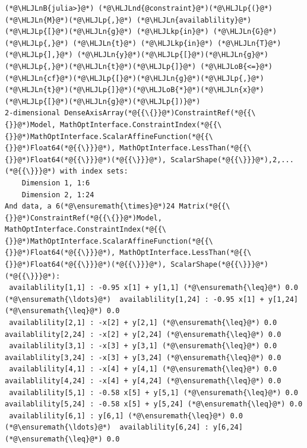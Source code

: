\documentclass[12pt,a4paper]{article}
\newcommand{\HLJLkp}[1]{\textcolor[RGB]{148,91,176}{\textbf{#1}}}
\newcommand{\HLJLn}[1]{#1}
\newcommand{\HLJLnd}[1]{\textcolor[RGB]{214,102,97}{#1}}
\newcommand{\HLJLnB}[1]{\textcolor[RGB]{59,151,46}{#1}}
\newcommand{\HLJLoB}[1]{\textcolor[RGB]{102,102,102}{\textbf{#1}}}
\newcommand{\HLJLp}[1]{#1}
\begin{document}
\begin{lstlisting}
(*@\HLJLnB{julia>}@*) (*@\HLJLnd{@constraint}@*)(*@\HLJLp{(}@*)(*@\HLJLn{M}@*)(*@\HLJLp{,}@*) (*@\HLJLn{availablility}@*)(*@\HLJLp{[}@*)(*@\HLJLn{g}@*) (*@\HLJLkp{in}@*) (*@\HLJLn{G}@*)(*@\HLJLp{,}@*) (*@\HLJLn{t}@*) (*@\HLJLkp{in}@*) (*@\HLJLn{T}@*)(*@\HLJLp{],}@*) (*@\HLJLn{y}@*)(*@\HLJLp{[}@*)(*@\HLJLn{g}@*)(*@\HLJLp{,}@*)(*@\HLJLn{t}@*)(*@\HLJLp{]}@*) (*@\HLJLoB{<=}@*) (*@\HLJLn{cf}@*)(*@\HLJLp{[}@*)(*@\HLJLn{g}@*)(*@\HLJLp{,}@*)(*@\HLJLn{t}@*)(*@\HLJLp{]}@*)(*@\HLJLoB{*}@*)(*@\HLJLn{x}@*)(*@\HLJLp{[}@*)(*@\HLJLn{g}@*)(*@\HLJLp{])}@*)
2-dimensional DenseAxisArray(*@{{\{}}@*)ConstraintRef(*@{{\{}}@*)Model, MathOptInterface.ConstraintIndex(*@{{\{}}@*)MathOptInterface.ScalarAffineFunction(*@{{\{}}@*)Float64(*@{{\}}}@*), MathOptInterface.LessThan(*@{{\{}}@*)Float64(*@{{\}}}@*)(*@{{\}}}@*), ScalarShape(*@{{\}}}@*),2,...(*@{{\}}}@*) with index sets:
    Dimension 1, 1:6
    Dimension 2, 1:24
And data, a 6(*@\ensuremath{\times}@*)24 Matrix(*@{{\{}}@*)ConstraintRef(*@{{\{}}@*)Model, MathOptInterface.ConstraintIndex(*@{{\{}}@*)MathOptInterface.ScalarAffineFunction(*@{{\{}}@*)Float64(*@{{\}}}@*), MathOptInterface.LessThan(*@{{\{}}@*)Float64(*@{{\}}}@*)(*@{{\}}}@*), ScalarShape(*@{{\}}}@*)(*@{{\}}}@*):
 availablility[1,1] : -0.95 x[1] + y[1,1] (*@\ensuremath{\leq}@*) 0.0  (*@\ensuremath{\ldots}@*)  availablility[1,24] : -0.95 x[1] + y[1,24] (*@\ensuremath{\leq}@*) 0.0
 availablility[2,1] : -x[2] + y[2,1] (*@\ensuremath{\leq}@*) 0.0          availablility[2,24] : -x[2] + y[2,24] (*@\ensuremath{\leq}@*) 0.0
 availablility[3,1] : -x[3] + y[3,1] (*@\ensuremath{\leq}@*) 0.0          availablility[3,24] : -x[3] + y[3,24] (*@\ensuremath{\leq}@*) 0.0
 availablility[4,1] : -x[4] + y[4,1] (*@\ensuremath{\leq}@*) 0.0          availablility[4,24] : -x[4] + y[4,24] (*@\ensuremath{\leq}@*) 0.0
 availablility[5,1] : -0.58 x[5] + y[5,1] (*@\ensuremath{\leq}@*) 0.0     availablility[5,24] : -0.58 x[5] + y[5,24] (*@\ensuremath{\leq}@*) 0.0
 availablility[6,1] : y[6,1] (*@\ensuremath{\leq}@*) 0.0               (*@\ensuremath{\ldots}@*)  availablility[6,24] : y[6,24] (*@\ensuremath{\leq}@*) 0.0


\end{lstlisting}
\end{document}
